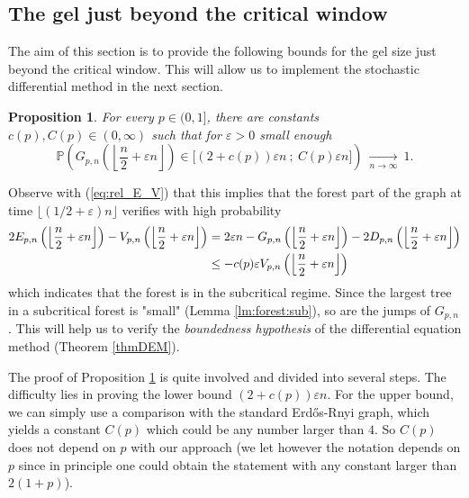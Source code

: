 \documentclass[a4, 11pt]{article}
\numberwithin{equation}{section}
\theoremstyle{plain}
\newtheorem{proposition}[theorem]{Proposition}
\theoremstyle{definition}
\theoremstyle{remark}
\begin{document}
	
	\subsection{The gel just beyond the critical window}\label{section:starting_pt}
	
	The aim of this section is to provide the following bounds for the gel size just beyond the critical window. This will allow us to implement the stochastic differential method in the next section. 
	
	\begin{proposition}\label{prop:starting_pt}
		For every $p\in (0,1]$, there are constants $c(p),C(p) \in (0,\infty)$ such that for $\varepsilon>0$ small enough
		$$\mathbb{P}\left(G_{p,n}\left(\left\lfloor\frac{n}{2}+\varepsilon n\right\rfloor\right) \in \big[(2+c(p))\varepsilon n~;~C(p)\varepsilon n \big]\right)~\underset{n\to \infty} \longrightarrow~1.  $$ 
	\end{proposition}
Observe with (\ref{eq:rel_E_V}) that this implies that the forest part of the graph at time $\lfloor (1/2 +\varepsilon) n \rfloor$ verifies with high probability
	\begin{align}
		2E_{p,n}\left(\left\lfloor\frac{n}{2}+\varepsilon n\right\rfloor\right)-V_{p,n}\left(\left\lfloor\frac{n}{2}+\varepsilon n\right\rfloor\right)&=2\varepsilon n-G_{p,n}\left(\left\lfloor\frac{n}{2}+\varepsilon n\right\rfloor\right)-2D_{p,n}\left(\left\lfloor\frac{n}{2}+\varepsilon n\right\rfloor\right)\notag\\
		&\leq -c(p)\varepsilon V_{p,n}\left(\left\lfloor\frac{n}{2}+\varepsilon n\right\rfloor\right)\notag
	\end{align}
which indicates that the forest is in the subcritical regime. Since the largest tree in a subcritical forest is "small" (Lemma \ref{lm:forest:sub}), so are the jumps of $G_{p,n}$. This will help us to verify the \emph{boundedness hypothesis} of the differential equation method (Theorem \ref{thmDEM}). 

The proof of Proposition \ref{prop:starting_pt} is quite involved and divided into several steps. The difficulty lies in proving the lower bound $(2+c(p))\varepsilon n$. For the upper bound, we can simply use a comparison with the standard  Erd\H{o}s-Rnyi graph, which yields a constant $C(p)$ which could be any number larger than $4$. So $C(p)$ does not depend on $p$ with our approach (we let however the notation depends on $p$ since in principle one could obtain the statement with any constant larger than $2(1+p)$).
\end{document}
